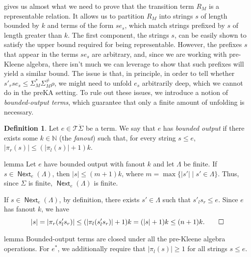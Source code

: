 \documentclass[11pt,a4paper]{amsart}
\theoremstyle{definition}
\newtheorem{definition}[theorem]{Definition}
\DeclareMathOperator{\Next}{\mathsf{Next}}
\begin{document}
 gives us almost what we need to prove that the transition
term $R_M$ is a representable relation. It allows us to partition \(R_M\) into
strings $s$ of length bounded by $k$ and terms of the form $se_s$, which match
strings prefixed by $s$ of length greater than $k$.  The first component, the
strings $s$, can be easily shown to satisfy the upper bound required for being
representable. However, the prefixes $s$ that appear in the terms $se_s$ are
arbitrary, and, since we are working with pre-Kleene algebra, there isn't much
we can leverage to show that such prefixes will yield a similar bound.  The
issue is that, in principle, in order to tell whether
$s'_rse_s  \leq   \Sigma _M^* \Sigma _M^{ \neq } \rho $, we might need to unfold $e_s$ arbitrarily deep,
which we cannot do in the preKA setting.  To rule out these issues, we introduce
a notion of \emph{bounded-output terms}, which guarantee that only a finite
amount of unfolding is necessary.

\begin{definition}
  \label{def:bounded-output}
  Let $e  \in  \mathcal{T}\ddot{ \Sigma }$ be a term.  We say that $e$ has \emph{bounded
    output} if there exists some $k  \in  \mathbb{N}$ (the \emph{fanout}) such that, for
  every string $s  \leq  e$, $| \pi _r(s)|  \leq  (| \pi _l(s)|+1)k$.
\end{definition}

\begin{theoremEnd}{lemma}
  \label{lem:step-finite}
  Let $e$ have bounded output with fanout $k$ and let $ \Lambda $ be finite.  If
  $s  \in  \Next_e( \Lambda )$, then $|s|  \leq  (m+1)k$, where $m = \max\{ |s'|  \mid  s'  \in   \Lambda \}$.
  Thus, since $ \Sigma $ is finite, $\Next_e( \Lambda )$ is finite.
\end{theoremEnd}

\begin{proofEnd}
  If $s  \in  \Next_e( \Lambda )$, by definition, there exists $s'  \in   \Lambda $ such that
  $s'_ls_r  \leq  e$.  Since $e$ has fanout $k$, we have
  \[ |s| = | \pi _r(s'_ls_r)|  \leq  (| \pi _l(s'_ls_r)|+1)k = (|s|+1)k  \leq  (n+1)k. \qedhere\]
\end{proofEnd}

\begin{theoremEnd}{lemma}
  \label{lem:bounded-output-closure}
  Bounded-output terms are closed under all the pre-Kleene algebra
  operations. For $e^*$, we additionally require that $| \pi _l(s)|  \geq  1$ for all
  strings $s  \leq  e$.
\end{theoremEnd}
\end{document}
